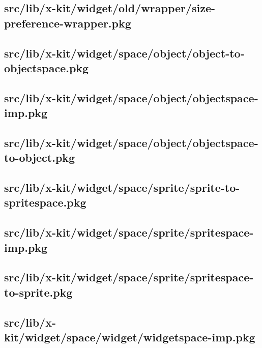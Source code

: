 \subsection{src/lib/x-kit/widget/old/wrapper/size-preference-wrapper.pkg}


\subsection{src/lib/x-kit/widget/space/object/object-to-objectspace.pkg}


\subsection{src/lib/x-kit/widget/space/object/objectspace-imp.pkg}


\subsection{src/lib/x-kit/widget/space/object/objectspace-to-object.pkg}


\subsection{src/lib/x-kit/widget/space/sprite/sprite-to-spritespace.pkg}


\subsection{src/lib/x-kit/widget/space/sprite/spritespace-imp.pkg}


\subsection{src/lib/x-kit/widget/space/sprite/spritespace-to-sprite.pkg}


\subsection{src/lib/x-kit/widget/space/widget/widgetspace-imp.pkg}


